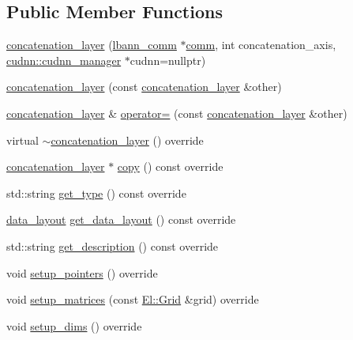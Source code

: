 \subsection*{Public Member Functions}
\begin{DoxyCompactItemize}
\item 
\hyperlink{classlbann_1_1concatenation__layer_ab826328d5224933dfc90e246d16de50e}{concatenation\+\_\+layer} (\hyperlink{classlbann_1_1lbann__comm}{lbann\+\_\+comm} $\ast$\hyperlink{file__io_8cpp_ab048c6f9fcbcfaa57ce68b00263dbebe}{comm}, int concatenation\+\_\+axis, \hyperlink{classlbann_1_1cudnn_1_1cudnn__manager}{cudnn\+::cudnn\+\_\+manager} $\ast$cudnn=nullptr)
\item 
\hyperlink{classlbann_1_1concatenation__layer_a0498925fcb0a42f1bc8fd1913b9090fc}{concatenation\+\_\+layer} (const \hyperlink{classlbann_1_1concatenation__layer}{concatenation\+\_\+layer} \&other)
\item 
\hyperlink{classlbann_1_1concatenation__layer}{concatenation\+\_\+layer} \& \hyperlink{classlbann_1_1concatenation__layer_af91f0850e13dd854e095f2c9d00d58b2}{operator=} (const \hyperlink{classlbann_1_1concatenation__layer}{concatenation\+\_\+layer} \&other)
\item 
virtual \hyperlink{classlbann_1_1concatenation__layer_a5c2b47a4e494ba1fe20f4ec956f981e1}{$\sim$concatenation\+\_\+layer} () override
\item 
\hyperlink{classlbann_1_1concatenation__layer}{concatenation\+\_\+layer} $\ast$ \hyperlink{classlbann_1_1concatenation__layer_a8cdb0b6f5dee578477a3125f5da74573}{copy} () const override
\item 
std\+::string \hyperlink{classlbann_1_1concatenation__layer_a5c6edd4ca11a102b809987851f51e2d4}{get\+\_\+type} () const override
\item 
\hyperlink{base_8hpp_a786677cbfb3f5677b4d84f3056eb08db}{data\+\_\+layout} \hyperlink{classlbann_1_1concatenation__layer_afa17d94708fe6d35db2925f664104d42}{get\+\_\+data\+\_\+layout} () const override
\item 
std\+::string \hyperlink{classlbann_1_1concatenation__layer_a2154ad33b4bacbb5caed95fdebc735ca}{get\+\_\+description} () const override
\item 
void \hyperlink{classlbann_1_1concatenation__layer_a20c1588e7a506bc7b0acb4d63586ece9}{setup\+\_\+pointers} () override
\item 
void \hyperlink{classlbann_1_1concatenation__layer_a9c305ea0cbee1b7b6fe822f514c48d42}{setup\+\_\+matrices} (const \hyperlink{base_8hpp_a9951bb1719d534e0401b1f06cad19eab}{El\+::\+Grid} \&grid) override
\item 
void \hyperlink{classlbann_1_1concatenation__layer_abc44199934950480dbde30e0b7058a78}{setup\+\_\+dims} () override
\end{DoxyCompactItemize}
